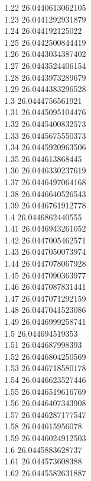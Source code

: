 {1.22	26.0440613062105\\
1.23	26.0441292931879\\
1.24	26.044192125022\\
1.25	26.0442500844419\\
1.26	26.0443034387402\\
1.27	26.0443524406154\\
1.28	26.0443973289679\\
1.29	26.0444383296528\\
1.3	26.0444756561921\\
1.31	26.0445095104476\\
1.32	26.0445400832573\\
1.33	26.0445675550373\\
1.34	26.0445920963506\\
1.35	26.044613868445\\
1.36	26.0446330237619\\
1.37	26.0446497064168\\
1.38	26.0446640526543\\
1.39	26.0446761912778\\
1.4	26.0446862440555\\
1.41	26.0446943261052\\
1.42	26.0447005462571\\
1.43	26.0447050073974\\
1.44	26.0447078067928\\
1.45	26.0447090363977\\
1.46	26.0447087831441\\
1.47	26.0447071292159\\
1.48	26.0447041523086\\
1.49	26.0446999258741\\
1.5	26.044694519353\\
1.51	26.044687998393\\
1.52	26.0446804250569\\
1.53	26.0446718580178\\
1.54	26.0446623527446\\
1.55	26.0446519616769\\
1.56	26.0446407343908\\
1.57	26.0446287177547\\
1.58	26.044615956078\\
1.59	26.0446024912503\\
1.6	26.0445883628737\\
1.61	26.044573608388\\
1.62	26.0445582631887\\
}
